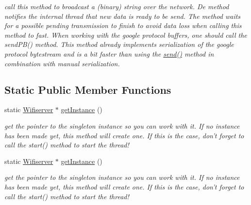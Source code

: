 \begin{DoxyCompactItemize}
\begin{DoxyCompactList}\small\item\em call this method to broadcast a (binary) string over the network. De method notifies the internal thread that new data is ready to be send. The method waits for a possible pending transmission to finish to avoid data loss when calling this method to fast. When working with the google protocol buffers, one should call the send\-P\-B() method. This method already implements serialization of the google protocol bytestream and is a bit faster than using the \hyperlink{class_wifiserver_a059352fafb15b8213b5303f13151b4b8}{send()} method in combination with manual serialization. \end{DoxyCompactList}\end{DoxyCompactItemize}
\subsection*{Static Public Member Functions}
\begin{DoxyCompactItemize}
\item 
\hypertarget{class_wifiserver_a332aba644eee1ed9544fa4e916d3baa5}{static \hyperlink{class_wifiserver}{Wifiserver} $\ast$ \hyperlink{class_wifiserver_a332aba644eee1ed9544fa4e916d3baa5}{get\-Instance} ()}\label{class_wifiserver_a332aba644eee1ed9544fa4e916d3baa5}

\begin{DoxyCompactList}\small\item\em get the pointer to the singleton instance so you can work with it. If no instance has been made yet, this method will create one. If this is the case, don't forget to call the start() method to start the thread! \end{DoxyCompactList}\item 
\hypertarget{class_wifiserver_ac50428c59914509a4838fa3d074dfd0b}{static \hyperlink{class_wifiserver}{Wifiserver} $\ast$ \hyperlink{class_wifiserver_ac50428c59914509a4838fa3d074dfd0b}{get\-Instance} ()}\label{class_wifiserver_ac50428c59914509a4838fa3d074dfd0b}

\begin{DoxyCompactList}\small\item\em get the pointer to the singleton instance so you can work with it. If no instance has been made yet, this method will create one. If this is the case, don't forget to call the start() method to start the thread! \end{DoxyCompactList}\end{DoxyCompactItemize}
